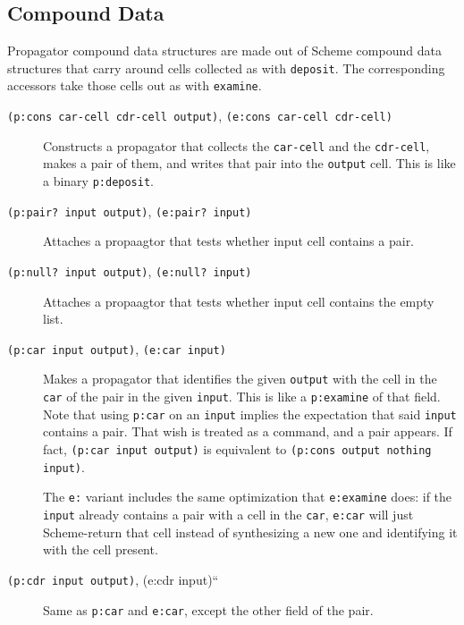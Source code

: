 \documentclass[12pt,letterpaper,english]{article}
\begin{document}

\hypertarget{compound-data}{}
\subsection{Compound Data}
\label{compound-data}

Propagator compound data structures are made out of Scheme compound
data structures that carry around cells collected as with \texttt{deposit}.
The corresponding accessors take those cells out as with \texttt{examine}.
\begin{description}
\item[{\texttt{(p:cons car-cell cdr-cell output)}, \texttt{(e:cons car-cell cdr-cell)}}] \leavevmode 
Constructs a propagator that collects the \texttt{car-cell} and the
\texttt{cdr-cell}, makes a pair of them, and writes that pair into the
\texttt{output} cell.  This is like a binary \texttt{p:deposit}.

\item[{\texttt{(p:pair? input output)}, \texttt{(e:pair? input)}}] \leavevmode 
Attaches a propaagtor that tests whether input cell contains a
pair.

\item[{\texttt{(p:null? input output)}, \texttt{(e:null? input)}}] \leavevmode 
Attaches a propaagtor that tests whether input cell contains
the empty list.

\item[{\texttt{(p:car input output)}, \texttt{(e:car input)}}] \leavevmode 
Makes a propagator that identifies the given \texttt{output} with the
cell in the \texttt{car} of the pair in the given \texttt{input}.  This is
like a \texttt{p:examine} of that field.  Note that using \texttt{p:car} on an
\texttt{input} implies the expectation that said \texttt{input} contains a
pair.  That wish is treated as a command, and a pair appears.
If fact, \texttt{(p:car input output)} is equivalent to
\texttt{(p:cons output nothing input)}.

The \texttt{e:} variant includes the same optimization that \texttt{e:examine}
does: if the \texttt{input} already contains a pair with a cell in the
\texttt{car}, \texttt{e:car} will just Scheme-return that cell instead of
synthesizing a new one and identifying it with the cell present.

\item[{\texttt{(p:cdr input output)}, (e:cdr input)``}] \leavevmode 
Same as \texttt{p:car} and \texttt{e:car}, except the other field of the
pair.

\end{description}
\end{document}
